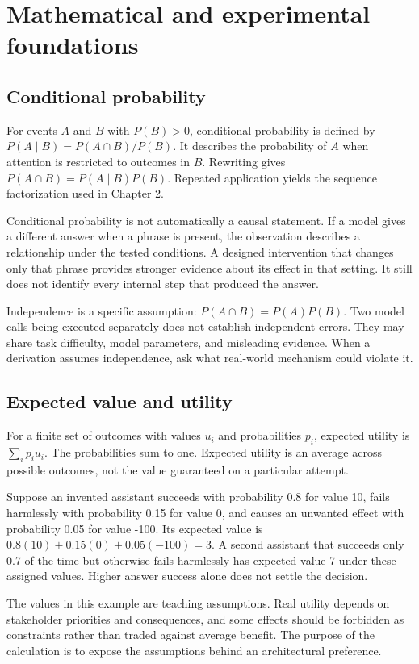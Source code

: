 \chapter{Mathematical and experimental foundations}
\section{Conditional probability}
For events \(A\) and \(B\) with \(P(B)>0\), conditional probability is defined by \(P(A\mid B)=P(A\cap B)/P(B)\). It describes the probability of \(A\) when attention is restricted to outcomes in \(B\). Rewriting gives \(P(A\cap B)=P(A\mid B)P(B)\). Repeated application yields the sequence factorization used in Chapter 2.

Conditional probability is not automatically a causal statement. If a model gives a different answer when a phrase is present, the observation describes a relationship under the tested conditions. A designed intervention that changes only that phrase provides stronger evidence about its effect in that setting. It still does not identify every internal step that produced the answer.

Independence is a specific assumption: \(P(A\cap B)=P(A)P(B)\). Two model calls being executed separately does not establish independent errors. They may share task difficulty, model parameters, and misleading evidence. When a derivation assumes independence, ask what real-world mechanism could violate it.

\section{Expected value and utility}
For a finite set of outcomes with values \(u_i\) and probabilities \(p_i\), expected utility is \(\sum_i p_i u_i\). The probabilities sum to one. Expected utility is an average across possible outcomes, not the value guaranteed on a particular attempt.

Suppose an invented assistant succeeds with probability 0.8 for value 10, fails harmlessly with probability 0.15 for value 0, and causes an unwanted effect with probability 0.05 for value -100. Its expected value is \(0.8(10)+0.15(0)+0.05(-100)=3\). A second assistant that succeeds only 0.7 of the time but otherwise fails harmlessly has expected value 7 under these assigned values. Higher answer success alone does not settle the decision.

The values in this example are teaching assumptions. Real utility depends on stakeholder priorities and consequences, and some effects should be forbidden as constraints rather than traded against average benefit. The purpose of the calculation is to expose the assumptions behind an architectural preference.

